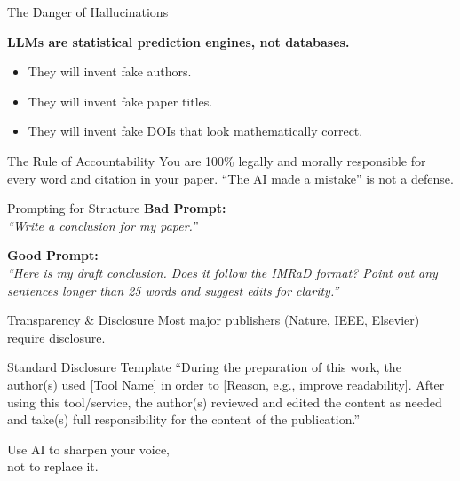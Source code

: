 \documentclass[aspectratio=169]{beamer}
\begin{document}
\begin{frame}{The Danger of Hallucinations}
  \begin{center}
    \Large \textbf{LLMs are statistical prediction engines, not databases.}
  \end{center}
  \vspace{0.5cm}
  \begin{itemize}
    \item They will invent fake authors.
    \item They will invent fake paper titles.
    \item They will invent fake DOIs that look mathematically correct.
  \end{itemize}
  \vspace{0.5cm}
  \begin{alertblock}{The Rule of Accountability}
    You are 100\% legally and morally responsible for every word and citation in your paper. ``The AI made a mistake'' is not a defense.
  \end{alertblock}
\end{frame}

\begin{frame}{Prompting for Structure}
  \textbf{Bad Prompt:} \\
  \textit{``Write a conclusion for my paper.''}
  
  \vspace{0.5cm}
  
  \textbf{Good Prompt:} \\
  \textit{``Here is my draft conclusion. Does it follow the IMRaD format? Point out any sentences longer than 25 words and suggest edits for clarity.''}
\end{frame}

\begin{frame}{Transparency \& Disclosure}
  Most major publishers (Nature, IEEE, Elsevier) require disclosure.
  \vspace{0.5cm}
  \begin{exampleblock}{Standard Disclosure Template}
    ``During the preparation of this work, the author(s) used [Tool Name] in order to [Reason, e.g., improve readability]. After using this tool/service, the author(s) reviewed and edited the content as needed and take(s) full responsibility for the content of the publication.''
  \end{exampleblock}
\end{frame}

\begin{frame}[standout]
  Use AI to sharpen your voice,\\
  not to replace it.
\end{frame}
\end{document}
